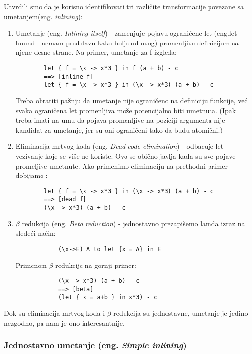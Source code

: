 Utvrdili smo da je korisno identifikovati tri različite transformacije povezane sa umetanjem(eng. \emph{inlining}):
\begin{enumerate}
	\item  Umetanje (eng.\emph{ Inlining itself}) - zamenjuje pojavu ograničene let (eng.let-bound - nemam predstavu kako bolje od ovog)  	promenljive definicijom sa njene desne strane. Na primer, umetanje za f izgleda: 
	\begin{verbatim}
		let { f = \x -> x*3 } in f (a + b) - c
		==> [inline f]
		let { f = \x -> x*3 } in (\x -> x*3) (a + b) - c
	\end{verbatim}
	Treba obratiti pažnju da umetanje nije ograničeno na definiciju funkcije, već svaka ograničena let promenljiva može potencijalno biti umetnuta. (Ipak treba imati na umu da pojava promenljive na poziciji argumenta nije kandidat za umetanje, jer su oni ograničeni tako da budu atomični.)
	\item Eliminacija mrtvog koda (eng. \emph{Dead code elimination}) - odbacuje let vezivanje koje se više ne koriste. Ovo se obično javlja 
	kada su sve pojave promeljive umetnute. Ako primenimo eliminaciju na prethodni primer dobijamo :
	\begin{verbatim}
		let { f = \x -> x*3 } in (\x -> x*3) (a + b) - c
		==> [dead f]
		(\x -> x*3) (a + b) - c
	\end{verbatim}
	\item $\beta$  redukcija (eng. \emph{Beta reduction}) - jednostavno prezapišemo lamda izraz na sledeći način:
		\begin{verbatim}
			(\x->E) A to let {x = A} in E 
		\end{verbatim} Primenom $\beta$ redukcije na gornji primer:
		\begin{verbatim}
			(\x -> x*3) (a + b) - c
			==> [beta]
			(let { x = a+b } in x*3) - c
		\end{verbatim}
\end{enumerate}

Dok su eliminacija mrtvog koda i $\beta$ redukcija su jednostavne, umetanje je jedino nezgodno, pa nam je ono interesantnije.

\subsubsection{Jednostavno umetanje (eng. \emph{Simple inlining})}
\label{sec:podpodnaslovSimpleInline}

